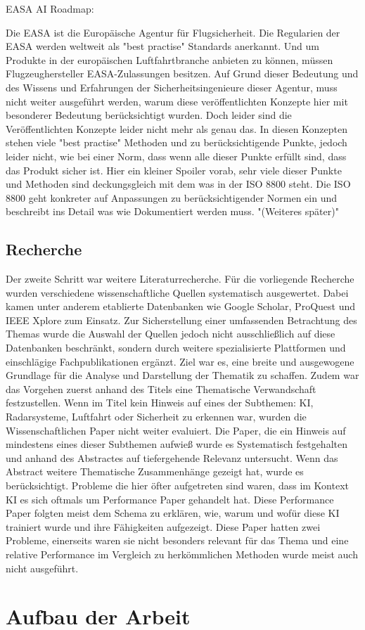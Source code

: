 EASA AI Roadmap:

Die EASA ist die Europäische Agentur für Flugsicherheit. Die Regularien der EASA werden weltweit als "best practise" Standards anerkannt.
Und um Produkte in der europäischen Luftfahrtbranche anbieten zu können, müssen Flugzeughersteller EASA-Zulassungen besitzen. 
Auf Grund dieser Bedeutung und des Wissens und Erfahrungen der Sicherheitsingenieure dieser Agentur, muss nicht weiter 
ausgeführt werden, warum diese veröffentlichten Konzepte hier mit besonderer Bedeutung berücksichtigt wurden.
Doch leider sind die Veröffentlichten Konzepte leider nicht mehr als genau das. In diesen Konzepten stehen 
viele "best practise" Methoden und zu berücksichtigende Punkte, jedoch leider nicht, wie bei einer Norm, 
dass wenn alle dieser Punkte erfüllt sind, dass das Produkt sicher ist. Hier ein kleiner Spoiler vorab, sehr viele dieser Punkte 
und Methoden sind deckungsgleich mit dem was in der ISO 8800 steht. Die ISO 8800 geht konkreter auf Anpassungen 
zu berücksichtigender Normen ein und beschreibt ins Detail was wie Dokumentiert werden muss. "(Weiteres später)"

\section{Recherche}
Der zweite Schritt war weitere Literaturrecherche. Für die vorliegende Recherche wurden verschiedene wissenschaftliche Quellen systematisch ausgewertet. 
Dabei kamen unter anderem etablierte Datenbanken wie Google Scholar, ProQuest und IEEE Xplore zum Einsatz. 
Zur Sicherstellung einer umfassenden Betrachtung des Themas wurde die Auswahl der Quellen jedoch nicht 
ausschließlich auf diese Datenbanken beschränkt, sondern durch weitere spezialisierte Plattformen und 
einschlägige Fachpublikationen ergänzt. Ziel war es, eine breite und ausgewogene Grundlage für die Analyse 
und Darstellung der Thematik zu schaffen. Zudem war das Vorgehen zuerst anhand des Titels eine Thematische 
Verwandschaft festzustellen. Wenn im Titel kein Hinweis auf eines der Subthemen: KI, Radarsysteme, Luftfahrt 
oder Sicherheit zu erkennen war, wurden die Wissenschaftlichen Paper nicht weiter evaluiert. Die Paper, 
die ein Hinweis auf mindestens eines dieser Subthemen aufwieß wurde es Systematisch festgehalten und anhand 
des Abstractes auf tiefergehende Relevanz untersucht. Wenn das Abstract weitere Thematische Zusammenhänge 
gezeigt hat, wurde es berücksichtigt. Probleme die hier öfter aufgetreten sind waren, dass im Kontext KI 
es sich oftmals um Performance Paper gehandelt hat. Diese Performance Paper folgten meist dem Schema zu erklären, 
wie, warum und wofür diese KI trainiert wurde und ihre Fähigkeiten aufgezeigt. Diese Paper hatten zwei Probleme, 
einerseits waren sie nicht besonders relevant für das Thema und eine relative Performance im Vergleich zu 
herkömmlichen Methoden wurde meist auch nicht ausgeführt.


\chapter{Aufbau der Arbeit}